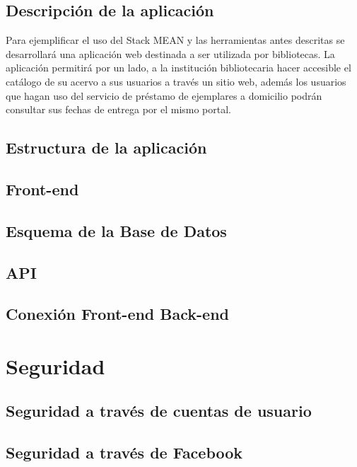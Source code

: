 \documentclass[10pt,a4paper]{report}
\begin{document}
\section{Descripción de la aplicación}
Para ejemplificar el uso del Stack MEAN y las herramientas antes descritas se desarrollará una aplicación web destinada a ser utilizada por bibliotecas. La aplicación permitirá por un lado, a la institución bibliotecaria hacer accesible el catálogo de su acervo a sus usuarios a través un sitio web, además los usuarios que hagan uso del servicio de préstamo de ejemplares a domicilio podrán consultar sus fechas de entrega por el mismo portal. 

\section{Estructura de la aplicación}
\section{Front-end}
\section{Esquema de la Base de Datos}
\section{API}
\section{Conexión Front-end Back-end}

\chapter{Seguridad}
\section{Seguridad a través de cuentas de usuario}
\section{Seguridad a través de Facebook}



\end{document}
